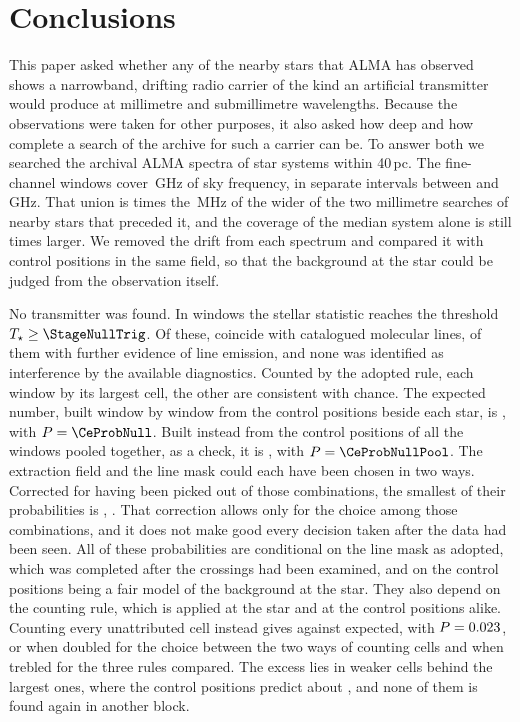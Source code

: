 \section{Conclusions}
\label{sec:conclusions}

This paper asked whether any of the nearby stars that ALMA has observed shows
a narrowband, drifting radio carrier of the kind an artificial transmitter
would produce at millimetre and submillimetre wavelengths. Because the
observations were taken for other purposes, it also asked how deep and how
complete a search of the archive for such a carrier can be. To answer both
we searched the archival ALMA spectra of \NSysClassA{} star systems within
40\,pc. The fine-channel windows cover \CvUnionA\,GHz of sky frequency, in
\CovNIslands{} separate intervals between \SurvFreqLoA{} and
\SurvFreqHiA\,GHz. That union is \SbPriorRatio{} times the \SbPriorBandMHz\,MHz of the
wider of the two millimetre searches of nearby stars that preceded it, and
the coverage of the median system alone is still \SbPriorRatioSysMed{}
times larger. We removed the drift from each spectrum and compared it with
control positions in the same field, so that the background at the star
could be judged from the observation itself.

No transmitter was found. In \CsNCross{} windows the stellar statistic reaches
the threshold $T_\star\geq\StageNullTrig$. Of these, \MkNCoinc{} coincide with
catalogued molecular lines, \LnAttrSupp{} of them with further evidence of
line emission, and none was identified as interference by the available
diagnostics. Counted by the adopted rule, each window by its largest cell, the
other \CeObs{} are consistent with chance. The expected number, built
window by window from the control positions beside each star, is \CeExp, with
$P=\CeProbNull$. Built instead from the control positions of all the windows
pooled together, as a check, it is \CeExpPool, with $P=\CeProbNullPool$. The extraction field and the line
mask could each have been chosen in two ways. Corrected for having been
picked out of those \CgNTrialWord{} combinations, the smallest of their
probabilities is \CgBonfPhrase, \CgVerdictClause. That correction allows only
for the choice among those combinations, and it does not make good every
decision taken after the data had been seen. All of these probabilities are
conditional on the line mask as adopted, which was completed
after the crossings had been examined, and on the control positions being a
fair model of the background at the star. They also depend on the counting
rule, which is applied at the star and at the control positions alike.
Counting every unattributed cell instead gives
\AcObsCell{} against \AcExpCell{} expected, with $P=0.023$, or
\AcProbCellTwoPhrase{} when doubled for the choice between the two ways of
counting cells and \AcProbCellThree{} when trebled for the three rules
compared. The excess lies in \AcStarSecNWord{} weaker cells behind the largest ones,
where the control positions predict about \AcSecExp, and none of them is
found again in another block.

